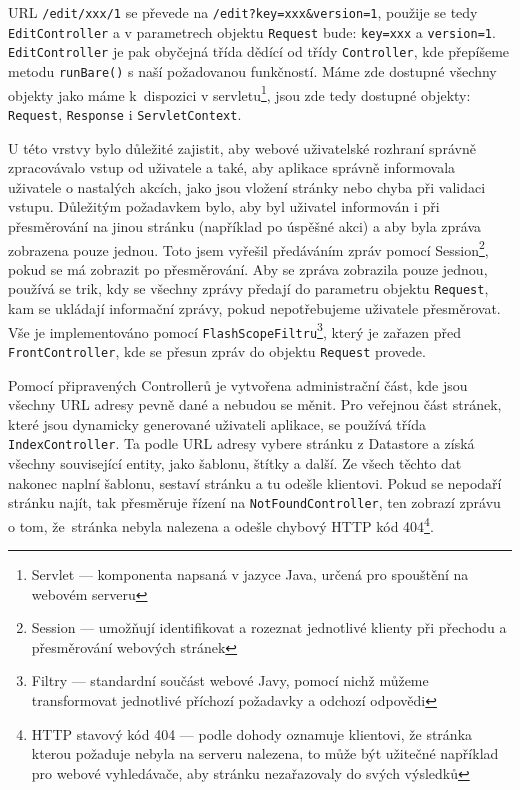 URL \verb|/edit/xxx/1| se převede na \verb|/edit?key=xxx&version=1|, použije se tedy \\ \verb|EditController| a v parametrech objektu \verb|Request| bude: \verb|key=xxx| a \verb|version=1|. \\ \verb|EditController| je pak obyčejná třída dědící od třídy \verb|Controller|, kde přepíšeme metodu \verb|runBare()| s naší požadovanou funkčností. Máme zde dostupné všechny objekty jako máme k~dispozici v servletu\footnote{Servlet --- komponenta napsaná v jazyce Java, určená pro spouštění na webovém serveru}, jsou zde tedy dostupné objekty: \verb|Request|, \verb|Response| i \verb|ServletContext|.

U této vrstvy bylo důležité zajistit, aby webové uživatelské rozhraní správně zpracovávalo vstup od uživatele a také, aby aplikace správně informovala uživatele o nastalých akcích, jako jsou vložení stránky nebo chyba při validaci vstupu. Důležitým požadavkem bylo, aby byl uživatel informován i při přesměrování na jinou stránku (například po úspěšné akci) a aby byla zpráva zobrazena pouze jednou. Toto jsem vyřešil předáváním zpráv pomocí Session\footnote{Session --- umožňují identifikovat a rozeznat jednotlivé klienty při přechodu a přesměrování webových stránek}, pokud se má zobrazit po přesměrování. Aby se zpráva zobrazila pouze jednou, používá se trik, kdy se všechny zprávy předají do parametru objektu \verb|Request|, kam se ukládají informační zprávy, pokud nepotřebujeme uživatele přesměrovat. Vše je implementováno pomocí \verb|FlashScopeFiltru|\footnote{Filtry --- standardní součást webové Javy, pomocí nichž můžeme transformovat jednotlivé příchozí požadavky a odchozí odpovědi}, který je zařazen před \verb|FrontController|, kde se přesun zpráv do objektu \verb|Request| provede.

Pomocí připravených Controllerů je vytvořena administrační část, kde jsou všechny URL adresy pevně dané a nebudou se měnit. Pro veřejnou část stránek, které jsou dynamicky generované uživateli aplikace, se používá třída \verb|IndexController|. Ta podle URL adresy vybere stránku z Datastore a získá všechny související entity, jako šablonu, štítky a další. Ze všech těchto dat nakonec naplní šablonu, sestaví stránku a tu odešle klientovi. Pokud se nepodaří stránku najít, tak přesměruje řízení na \verb|NotFoundController|, ten zobrazí zprávu o tom, že~stránka nebyla nalezena a odešle chybový HTTP kód 404\footnote{HTTP stavový kód 404 --- podle dohody oznamuje klientovi, že stránka kterou požaduje nebyla na serveru nalezena, to může být užitečné například pro webové vyhledávače, aby stránku nezařazovaly do svých výsledků}.

